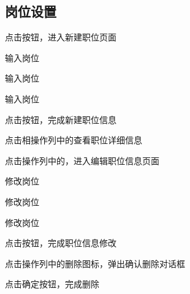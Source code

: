\subsection{岗位设置}
 {
    \item {} {
        \item  点击按钮，进入新建职位页面
        \item  输入岗位
        \item  输入岗位
        \item  输入岗位
        \item  点击按钮，完成新建职位信息
    }
    \item {} {
        \item  点击相操作列中的查看职位详细信息
    }
    \item {} {
        \item  点击操作列中的，进入编辑职位信息页面
        \item  修改岗位
        \item  修改岗位
        \item  修改岗位
        \item  点击按钮，完成职位信息修改
    }
    \item {} {
        \item  点击操作列中的删除图标，弹出确认删除对话框
        \item  点击确定按钮，完成删除
    }
}

